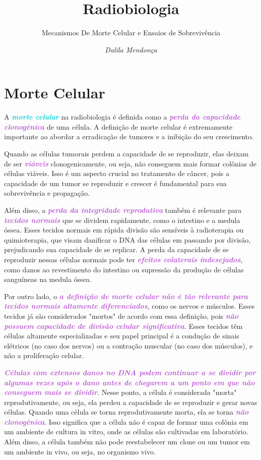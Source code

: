 \documentclass[11pt,a4paper]{article}
\title{\LobsterTwo\Huge{Radiobiologia}}
\author{\LobsterTwo\Large{Mecanismos De Morte Celular e Ensaios de Sobrevivência}\nocite{*}}
\date{\LobsterTwo\textit{Dalila Mendonça}}
\begin{document}
	\maketitle



\section{Morte Celular}

	A \textcolor{DarkTurquoise}{\textbf{\textit{morte celular}}} na radiobiologia é definida como a \textcolor{MediumOrchid}{\textbf{\textit{perda da capacidade clonogênica}}} de uma célula. A definição de morte celular é extremamente importante ao abordar a erradicação de tumores e a inibição do seu crescimento.
	
	Quando as células tumorais perdem a capacidade de se reproduzir, elas deixam de ser \textcolor{MediumOrchid}{\textbf{\textit{viáveis}}} clonogenicamente, ou seja, não conseguem mais formar colônias de células viáveis. Isso é um aspecto crucial no tratamento de câncer, pois a capacidade de um tumor se reproduzir e crescer é fundamental para sua sobrevivência e propagação.

	Além disso, a \textcolor{MediumOrchid}{\textbf{\textit{perda da integridade reprodutiva}}} também é relevante para \textcolor{MediumOrchid}{\textbf{\textit{tecidos normais}}} que se dividem rapidamente, como o intestino e a medula óssea. Esses tecidos normais em rápida divisão são sensíveis à radioterapia ou quimioterapia, que visam danificar o DNA das células em passando por divisão, prejudicando sua capacidade de se replicar. A perda da capacidade de se reproduzir nessas células normais pode ter \textcolor{MediumOrchid}{\textbf{\textit{efeitos colaterais indesejados}}}, como danos ao revestimento do intestino ou supressão da produção de células sanguíneas na medula óssea.

	Por outro lado, o \textcolor{MediumOrchid}{\textbf{\textit{a definição de morte celular não é tão relevante para tecidos normais altamente diferenciados}}}, como os nervos e músculos. Esses tecidos já são considerados "mortos" de acordo com essa definição, pois \textcolor{MediumOrchid}{\textbf{\textit{não possuem capacidade de divisão celular significativa}}}. Esses tecidos têm células altamente especializadas e seu papel principal é a condução de sinais elétricos (no caso dos nervos) ou a contração muscular (no caso dos músculos), e não a proliferação celular.

	\textcolor{MediumOrchid}{\textbf{\textit{Células com extensos danos no DNA podem continuar a se dividir por algumas vezes após o dano antes de chegarem a um ponto em que não conseguem mais se dividir}}}. Nesse ponto, a célula é considerada "morta" reprodutivamente, ou seja, ela perdeu a capacidade de se reproduzir e gerar novas células. Quando uma célula se torna reprodutivamente morta, ela se torna \textcolor{MediumOrchid}{\textbf{\textit{não clonogênica}}}. Isso significa que a célula não é capaz de formar uma colônia em um ambiente de cultura in vitro, onde as células são cultivadas em laboratório. Além disso, a célula também não pode reestabelecer um clone ou um tumor em um ambiente in vivo, ou seja, no organismo vivo.
\end{document}
